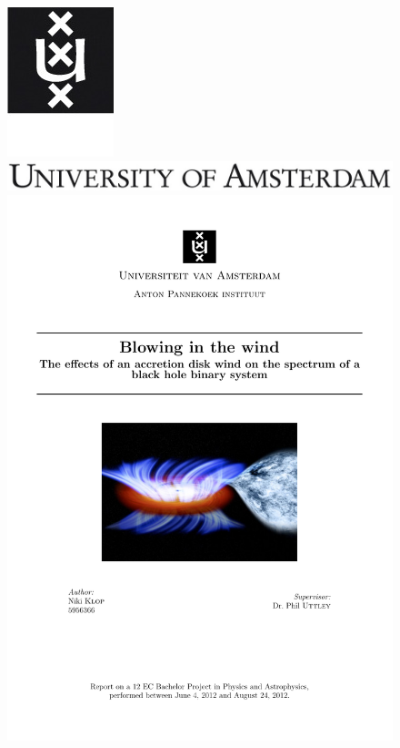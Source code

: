 \documentclass[a4paper]{article}
\begin{document}
\begin{figure}[h!] 
\begin{center} 
\includegraphics{UvA_Logo_Image_EN.jpg} \\
\includegraphics{UvA_Logo_Text_EN.jpg} \\
\includegraphics{API_Logo_Text.pdf} 
\end{center} 
\end{figure} 
\end{document}
